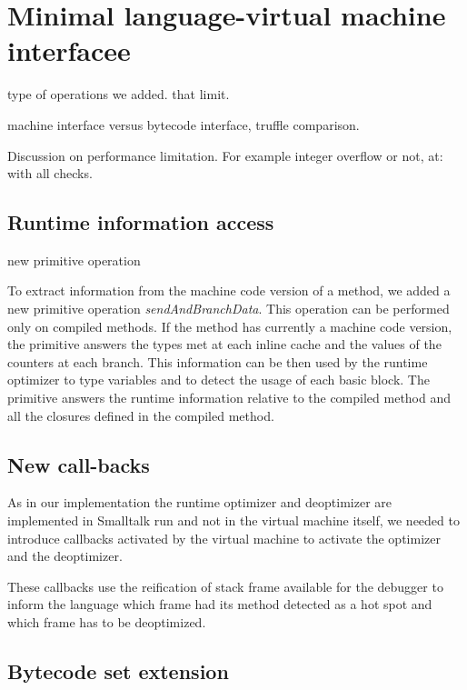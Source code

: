\documentclass[a4paper,12pt,twoside]{../includes/ThesisStyle}
\begin{document}
\fi

\chapter{Minimal language-virtual machine interfacee}
\label{chap:interface}
\minitoc


type of operations we added. that limit.

machine interface versus bytecode interface, truffle comparison.

Discussion on performance limitation. For example integer overflow or not, at: with all checks.


\section{Runtime information access}

new primitive operation

To extract information from the machine code version of a method, we added a new primitive operation \emph{sendAndBranchData}. This operation can be performed only on compiled methods. If the method has currently a machine code version, the primitive answers the types met at each inline cache and the values of the counters at each branch. This information can be then used by the runtime optimizer to type variables and to detect the usage of each basic block. The primitive answers the runtime information relative to the compiled method and all the closures defined in the compiled method.

\section{New call-backs}

As in our implementation the runtime optimizer and deoptimizer are implemented in Smalltalk run and not in the virtual machine itself, we needed to introduce callbacks activated by the virtual machine to activate the optimizer and the deoptimizer. 

These callbacks use the reification of stack frame available for the debugger to inform the language which frame had its method detected as a hot spot and which frame has to be deoptimized.

\section{Bytecode set extension}
\end{document}

